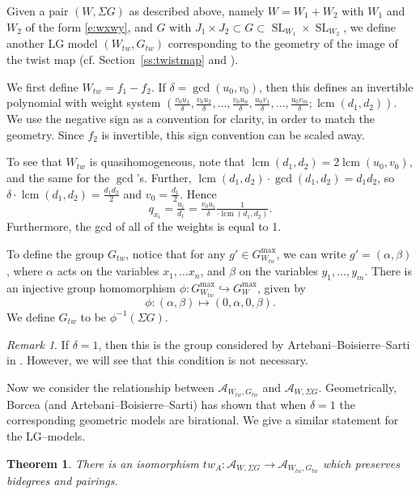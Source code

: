 \documentclass[10pt, letterpaper]{amsart}
\newtheorem{thm}{Theorem}%
\theoremstyle{remark}
\newtheorem{rem}{Remark}[thm]
\newcommand{\sA}{\mathscr{A}}
\newcommand{\tw}[1]{{#1}_{tw}}
\newcommand{\s}[1]{\Sigma #1}
\DeclareMathOperator{\SL}{SL}
\DeclareMathOperator{\lcm}{lcm}
\begin{document}
Given a pair $(W,\s{G})$ as described above, namely $W=W_1+W_2$ with $W_1$ and $W_2$ of the form \eqref{e:wxwy}, and $G$ with $J_1\times J_2\subset G\subset \SL_{W_1}\times \SL_{W_2}$, we define another LG model $(\tw{W}, \tw{G})$ corresponding to the geometry of the image of the twist map (cf. Section~\ref{ss:twistmap} and \cite{ABS}).

We first define $\tw{W}=f_1-f_2$. If $\delta=\gcd(u_0,v_0)$, then this defines an invertible polynomial with weight system $(\tfrac{v_0u_1}{\delta},\tfrac{v_0u_2}{\delta},\dots,\tfrac{v_0u_n}{\delta},\tfrac{u_0v_1}{\delta},\dots,\tfrac{u_0v_m}{\delta};\lcm(d_1,d_2))$. We use the negative sign as a convention for clarity, in order to match the geometry. Since $f_2$ is invertible, this sign convention can be scaled away. 


To see that $\tw{W}$ is quasihomogeneous, note that $\lcm(d_1,d_2)=2\lcm(u_0,v_0)$, and the same for the $\gcd$'s. Further,  $\lcm(d_1,d_2)\cdot\gcd(d_1,d_2)=d_1d_2$, so  $\delta\cdot\lcm(d_1,d_2)=\tfrac{d_1d_2}{2}$ and $v_0=\tfrac{d_1}{2}$. Hence
\[
q_{x_i}=\tfrac{u_i}{d_1}=\tfrac{v_0u_i}{\delta}\tfrac{1}{\cdot\lcm(d_1,d_2)}.
\]
Furthermore, the gcd of all of the weights is equal to 1. 


To define the group $\tw G$, notice that for any $g'\in G^{\max}_{\tw{W}}$,
we can write $g'=(\alpha, \beta)$, where $\alpha$ acts on the variables $x_1, \ldots x_n$, and $\beta$ on the variables $y_1, \ldots, y_m$. There is an injective group homomorphism $\phi:G_{\tw{W}}^{\max}\hookrightarrow G_{W}^{\max}$, given by 
\[
\phi: (\alpha,\beta)\mapsto (0,\alpha, 0, \beta). 
\]
We define $\tw{G}$ to be $\phi^{-1}(\s{G})$. \\

\begin{rem} If $\delta=1$, then this is the group considered by Artebani--Boisierre--Sarti in \cite{ABS}. However, we will see that this condition is not necessary. 
\end{rem}

Now we consider the relationship between $\sA_{\tw{W},\tw{G}}$ and $\sA_{W,\s{G}}$. Geometrically, Borcea (and Artebani--Boisierre--Sarti) has shown that when $\delta=1$ the corresponding geometric models are birational. We give a similar statement for the LG--models. 

\begin{thm}\label{t:twist}
There is an isomorphism $tw_A:\sA_{W,\s{G}}\to \sA_{ \tw{W}, \tw{G}}$ which preserves bidegrees and pairings. 
\end{thm}
\end{document}

